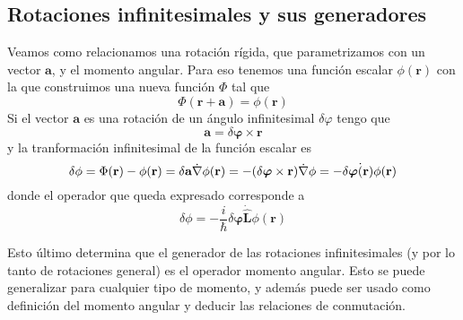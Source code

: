 \subsection{Rotaciones infinitesimales y sus generadores}

Veamos como relacionamos una rotación rígida, que parametrizamos con un vector $\textbf{a}$, y el momento angular.
Para eso tenemos una función escalar $\phi(\textbf{r})$ con la que construimos una nueva función $\Phi$ tal que
\[ \Phi(\boldsymbol{r} + \boldsymbol{a}) = \phi(\boldsymbol{r}) \]
Si el vector $\textbf{a}$ es una rotación de un ángulo infinitesimal $\delta \varphi$ tengo que
\[ \textbf{a} = \delta\boldsymbol{\varphi} \times \boldsymbol{r}\]
y la tranformación infinitesimal de la función escalar es
\[ \delta \phi = \Phi(\textbf{r}) - \phi(\textbf{r}) = \delta \textbf{a} \dot \nabla \phi(\textbf{r}) = - (\delta \boldsymbol{\varphi} \times \textbf{r}) \dot \nabla \phi = - \delta \boldsymbol{\varphi} \dot (\textbf{r}\time\nabla) \phi(\textbf{r})\]
donde el operador que queda expresado corresponde a
\begin{equation}
    \delta \phi = -\frac{i}{\hbar} \delta \boldsymbol{\varphi} \dot \hat{\textbf{L}} \phi(\textbf{r})
\end{equation}

Esto último determina que el generador de las rotaciones infinitesimales (y por lo tanto de rotaciones general) es el operador momento angular. 
Esto se puede generalizar para cualquier tipo de momento, y además puede ser usado como definición del momento angular y deducir las relaciones de conmutación.


